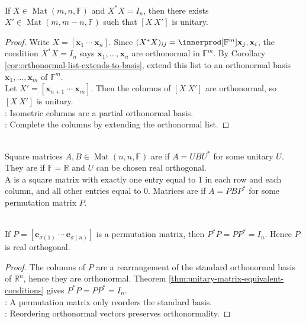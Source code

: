 \begin{theorem} \label{thm:extend-isometric-columns-to-unitary-matrix} \\
If $X\in\operatorname{Mat}(m,n,\mathbb{F})$ and $X^*X=I_n$, then there exists $X'\in\operatorname{Mat}(m,m-n,\mathbb{F})$ such that $[X\ X']$ is unitary.
\begin{proof}
Write $X=[\mathbf{x}_1\ \cdots\ \mathbf{x}_n]$. Since $(X^*X)_{ij}=\innerprod[\mathbb{F}^m]{\mathbf{x}_j,\mathbf{x}_i}$, the condition $X^*X=I_n$ says $\mathbf{x}_1,\ldots,\mathbf{x}_n$ are orthonormal in $\mathbb{F}^m$. By Corollary \ref{cor:orthonormal-list-extends-to-basis}, extend this list to an orthonormal basis $\mathbf{x}_1,\ldots,\mathbf{x}_m$ of $\mathbb{F}^m$.\\
Let $X'=[\mathbf{x}_{n+1}\ \cdots\ \mathbf{x}_m]$. Then the columns of $[X\ X']$ are orthonormal, so $[X\ X']$ is unitary.\\
: Isometric columns are a partial orthonormal basis.\\
: Complete the columns by extending the orthonormal list.
\end{proof}
\end{theorem}

\begin{definition} \label{def:unitary-and-permutation-similarity} \\
Square matrices $A,B\in\operatorname{Mat}(n,n,\mathbb{F})$ are  if $A=UBU^*$ for some unitary $U$. They are  if $\mathbb{F}=\mathbb{R}$ and $U$ can be chosen real orthogonal.\\
A  is a square matrix with exactly one entry equal to $1$ in each row and each column, and all other entries equal to $0$. Matrices are  if $A=PBP^*$ for some permutation matrix $P$.
\end{definition}

\begin{proposition} \label{prop:permutation-matrices-are-orthogonal} \\
If $P=[\mathbf{e}_{\sigma(1)}\ \cdots\ \mathbf{e}_{\sigma(n)}]$ is a permutation matrix, then $P^*P=PP^*=I_n$. Hence $P$ is real orthogonal.
\begin{proof}
The columns of $P$ are a rearrangement of the standard orthonormal basis of $\mathbb{R}^n$, hence they are orthonormal. Theorem \ref{thm:unitary-matrix-equivalent-conditions} gives $P^*P=PP^*=I_n$.\\
: A permutation matrix only reorders the standard basis.\\
: Reordering orthonormal vectors preserves orthonormality.
\end{proof}
\end{proposition}

